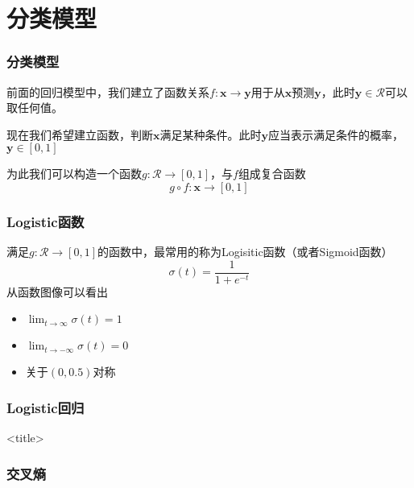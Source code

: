 \documentclass[14pt]{beamer}
\renewcommand{\vec}[1]{\bm{#1}}
\newcommand{\Vy}{\vec{y}}
\newcommand{\Vx}{\vec{x}}
\newcommand{\SR}{\mathcal{R}}
\let\emph\relax %
\begin{document}
\section{分类模型}

\begin{frame}
  \frametitle{分类模型}
  前面的回归模型中，我们建立了函数关系$f:\Vx\to\Vy$用于从$\Vx$预测$\Vy$，此时$\Vy\in \SR$可以取任何值。

  现在我们希望建立函数，判断$\Vx$\emph{是否}满足某种条件。此时$\Vy$应当表示满足条件的概率，$\Vy\in[0,1]$

  为此我们可以构造一个函数$g:\SR\to[0,1]$，与$f$组成复合函数
  \begin{equation}
    g\circ f:\Vx\to[0,1]
  \end{equation}
\end{frame}

\begin{frame}
  \frametitle{Logistic函数}
  满足$g:\SR\to[0,1]$的函数中，最常用的称为Logisitic函数（或者Sigmoid函数）
  \begin{equation}
    \sigma(t)=\frac{1}{1+e^{-t}}
  \end{equation}
  从函数图像可以看出
  \begin{itemize}
    \item $\lim_{t\to\infty}\sigma(t)=1$
    \item $\lim_{t\to-\infty}\sigma(t)=0$
    \item 关于$(0, 0.5)$对称
  \end{itemize}
  

\end{frame}
\begin{frame}
  \frametitle{Logistic回归}

  <title>

\end{frame}

\begin{frame}
  \frametitle{交叉熵}

  

\end{frame}
\end{document}
